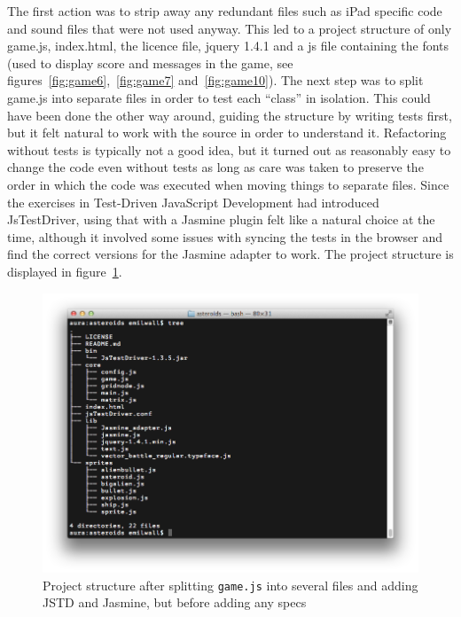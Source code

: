 \documentclass[11pt]{article}
\begin{document}
The first action was to strip away any redundant files such as iPad specific code and sound files that were not used anyway. This led to a project structure of only game.js, index.html, the licence file, jquery 1.4.1 and a \gls{js} file containing the fonts (used to display score and messages in the game, see figures~\ref{fig:game6},~\ref{fig:game7} and~\ref{fig:game10}). The next step was to split game.js into separate files in order to test each ``class'' in isolation. This could have been done the other way around, guiding the structure by writing tests first, but it felt natural to work with the source in order to understand it. Refactoring without tests is typically not a good idea\cite[p.~17]{}, but it turned out as reasonably easy to change the code even without tests as long as care was taken to preserve the order in which the code was executed when moving things to separate files. Since the exercises in Test-Driven JavaScript Development\cite{Tddjs} had introduced JsTestDriver, using that with a Jasmine plugin felt like a natural choice at the time, although it involved some issues with syncing the tests in the browser and find the correct versions for the Jasmine adapter to work. The project structure is displayed in figure~\ref{fig:tree}.

\begin{figure}[ht!]
\centering
\includegraphics[width=1.0\textwidth]{pics/tree.png}
\caption{Project structure after splitting \texttt{game.js} into several files and adding JSTD and Jasmine, but before adding any specs}
\label{fig:tree}
\end{figure}
\end{document}
